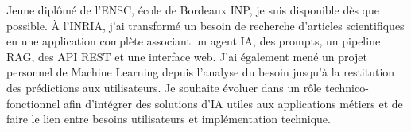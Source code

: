 
\begin{cvparagraph}
Jeune diplômé de l’ENSC, école de Bordeaux INP, je suis disponible dès que possible. À l’INRIA, j’ai transformé un besoin de recherche d’articles scientifiques en une application complète associant un agent IA, des prompts, un pipeline RAG, des API REST et une interface web. J’ai également mené un projet personnel de Machine Learning depuis l’analyse du besoin jusqu’à la restitution des prédictions aux utilisateurs. Je souhaite évoluer dans un rôle technico-fonctionnel afin d’intégrer des solutions d’IA utiles aux applications métiers et de faire le lien entre besoins utilisateurs et implémentation technique.
\end{cvparagraph}
